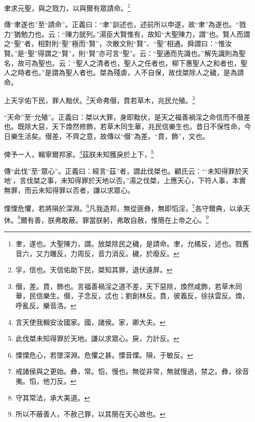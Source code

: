 聿求元聖，與之戮力，以與爾有眾請命。\footnote{聿，遂也。大聖陳力，謂。放桀除民之穢，是請命。聿，允橘反，述也。戮舊音六，又力雕反，力周反，音力消反。穢，於廢反。}

{\noindent\shu{}\fzkt 傳“聿遂也”至“請命”。正義曰：“聿”訓述也，述前所以申遂，故“聿”為遂也。“戮力”猶勉力也。云：“陳力就列。”湯臣大賢惟有，故知“大聖陳力，謂”也。賢人而謂之“聖”者，相對則“聖”極而“賢”，次散文則“賢”、“聖”相通。舜謂曰：“惟汝賢。”是“聖”得謂之“賢”，則“賢”亦可言“聖”。云：“聖通而先識也。”解先識則為聖名，故可為聖也。云：“聖人之清者也，聖人之任者也，柳下惠聖人之和者也，聖人之時者也。”是謂為聖人者也。桀為殘虐，人不自保，故伐桀除人之穢，是為請命。 \par}

上天孚佑下民，罪人黜伏。\footnote{孚，信也。天信佑助下民，桀知其罪，退伏遠屏。}天命弗僣，賁若草木，兆民允殖。\footnote{僣，差。賁，飾也。言福善禍淫之道不差，天下惡除，煥然咸飾，若草木同華，民信樂生。僣，子念反，忒也；劉創林反。賁，彼義反，徐扶雲反。煥，呼亂反。樂音洛。}

{\noindent\shu{}\fzkt “天命”至“允殖”。正義曰：桀以大罪，身即黜伏，是天之福善禍淫之命信而不僣差也。既除大惡，天下煥然修飾，若草木同生華，兆民信樂生也。昔日不保性命，今日樂生活矣。僣差，不齊之意，故傳以“僣”為差。“賁，飾”，文也。 \par}

俾予一人，輯寧爾邦家。\footnote{言天使我輯安汝國家。國，諸侯。家，卿大夫。}茲朕未知獲戾於上下，\footnote{此伐桀未知得罪於天地。謙以求眾心。戾，力計反。}

{\noindent\shu{}\fzkt 傳“此伐”至“眾心”。正義曰：經言“茲”者，謂此伐桀也。顧氏云：“‘未知得罪於天地’，言伐桀之事，未知得罪於天地以否。”湯之伐桀，上應天心，下符人事，本實無罪，而云未知得罪以否者，謙以求眾心。 \par}

慄慄危懼，若將隕於深淵。\footnote{慄慄危心，若墜深淵。危懼之甚。慄音慄。隕，于敏反。}凡我造邦，無從匪彝，無即慆淫，\footnote{戒諸侯與之更始。彝，常。慆，慢也。無從非常，無就慢過，禁之。彝，徐音夷。慆，他刀反。}各守爾典，以承天休。\footnote{守其常法，承大美道。}爾有善，朕弗敢蔽。罪當朕躬，弗敢自赦，惟簡在上帝之心。\footnote{所以不蔽善人，不赦己罪，以其簡在天心故也。}

